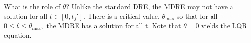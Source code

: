 What is the role of $\theta$?  Unlike the standard DRE, the MDRE may not have a solution for all $t\in[0,t_f']$. There is a critical value, $\theta_{\max}$ so that for all $0\leq\theta\leq\theta_{\max},$ the MDRE has a solution for all t. Note that $\theta = 0$ yields the LQR equation.




